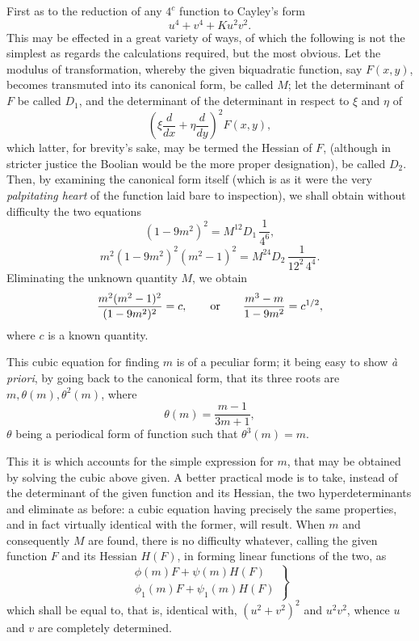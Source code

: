 \documentclass[11pt]{article}
\newcommand{\sourcepage}[1]{\marginpar{\scriptsize p.~#1}}
\begin{document}
{{\sourcepage{191}
First as to the reduction of any $4^c$ function to Cayley's form
\[
 u^4+v^4+Ku^2v^2.
\]
This may be effected in a great variety of ways, of which the following is not the simplest as regards the calculations required, but the most obvious. Let the modulus of transformation, whereby the given biquadratic function, say $F(x,y)$, becomes transmuted into its canonical form, be called $M$; let the determinant of $F$ be called $D_1$, and the determinant of the determinant in respect to $\xi$ and $\eta$ of
\[
 \left(\xi\frac{d}{dx}+\eta\frac{d}{dy}\right)^2F(x,y),
\]
which latter, for brevity's sake, may be termed the Hessian of $F$, (although in stricter justice the Boolian would be the more proper designation), be called $D_2$. Then, by examining the canonical form itself (which is as it were the very \emph{palpitating heart} of the function laid bare to inspection), we shall obtain without difficulty the two equations
\[
 (1-9m^2)^2=M^{12}D_1\,\frac{1}{4^6},
\]
\[
 m^2(1-9m^2)^2(m^2-1)^2=M^{24}D_2\,\frac{1}{12^2\,4^4}.
\]
Eliminating the unknown quantity $M$, we obtain
\[
 \frac{m^2(m^2-1)^2}{(1-9m^2)^2}=c,
 \qquad\hbox{or}\qquad
 \frac{m^3-m}{1-9m^2}=c^{1/2},
\]
where $c$ is a known quantity.

This cubic equation for finding $m$ is of a peculiar form; it being easy to show \emph{\`a priori}, by going back to the canonical form, that its three roots are $m,\theta(m),\theta^2(m)$, where
\[
 \theta(m)=\frac{m-1}{3m+1},
\]
$\theta$ being a periodical form of function such that $\theta^3(m)=m$.

This it is which accounts for the simple expression for $m$, that may be obtained by solving the cubic above given. A better practical mode is to take, instead of the determinant of the given function and its Hessian, the two hyperdeterminants and eliminate as before: a cubic equation having precisely the same properties, and in fact virtually identical with the former, will result. When $m$ and consequently $M$ are found, there is no difficulty whatever, calling the given function $F$ and its Hessian $H(F)$, in forming linear functions of the two, as
\[
 \left.
 \begin{array}{l}
 \phi(m)F+\psi(m)H(F)\\
 \phi_1(m)F+\psi_1(m)H(F)
 \end{array}
 \right\}
\]
which shall be equal to, that is, identical with, $(u^2+v^2)^2$ and $u^2v^2$, whence $u$ and $v$ are completely determined.

}}
\end{document}
